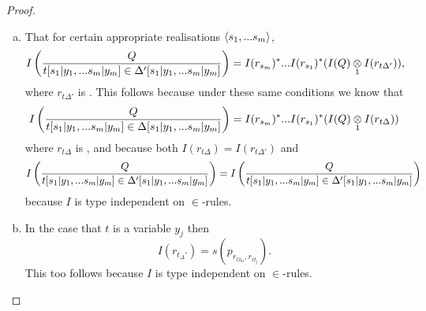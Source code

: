 \begin{proof}
\begin{enumerate}[(a)]
\item
That for certain appropriate realisations $\tuple{\sm}$,
$$ \Imappedrule{Q}{\ofT{t[\SUBsFORy{m}]}{\Delta'[\SUBsFORy{m}]}} = I(r_{s_m})^*...I(r_{s_1})^*(\crossx{I(Q)}{I(r_{t\Delta'})}{1}),$$
where  $r_{t\Delta'}$ is .
This follows because under these same conditions we know that
$$ \Imappedrule{Q}{\ofT{t[\SUBsFORy{m}]}{\Delta[\SUBsFORy{m}]}} = I(r_{s_m})^*...I(r_{s_1})^*(\crossx{I(Q)}{I(r_{t\Delta})}{1})$$
where  $r_{t\Delta}$ is ,
and because both $I(r_{t\Delta})=I(r_{t\Delta'})$ and 
$$\Imappedrule{Q}{\ofT{t[\SUBsFORy{m}]}{\Delta'[\SUBsFORy{m}]}} = \Imappedrule{Q}{\ofT{t[\SUBsFORy{m}]}{\Delta'[\SUBsFORy{m}]}}$$
because $I$ is type independent on $\in$-rules.
\item
In the case that $t$ is a variable $y_j$ then
$$I(r_{t_\Delta'})=s(p_{r_{\Omega_m},r_{\Omega_j}}).$$ This too follows because $I$ is type independent on $\in$-rules.
\end{enumerate}
\end{proof}

